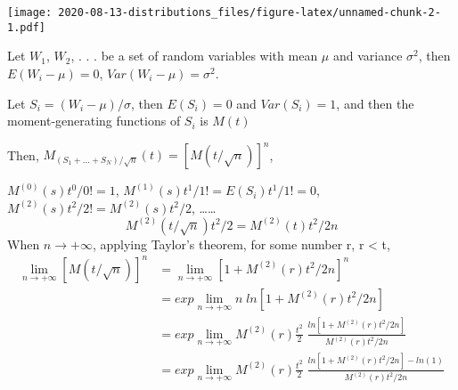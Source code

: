 \documentclass[
]{article}
\newenvironment{Shaded}{\begin{snugshade}}{\end{snugshade}}
\newcommand{\CharTok}[1]{\textcolor[rgb]{0.31,0.60,0.02}{#1}}
\newcommand{\DataTypeTok}[1]{\textcolor[rgb]{0.13,0.29,0.53}{#1}}
\newcommand{\DecValTok}[1]{\textcolor[rgb]{0.00,0.00,0.81}{#1}}
\newcommand{\FloatTok}[1]{\textcolor[rgb]{0.00,0.00,0.81}{#1}}
\newcommand{\KeywordTok}[1]{\textcolor[rgb]{0.13,0.29,0.53}{\textbf{#1}}}
\newcommand{\NormalTok}[1]{#1}
\newcommand{\OperatorTok}[1]{\textcolor[rgb]{0.81,0.36,0.00}{\textbf{#1}}}
\newcommand{\StringTok}[1]{\textcolor[rgb]{0.31,0.60,0.02}{#1}}
\begin{document}
\begin{Shaded}
\end{Shaded}

\texttt{[image: 2020-08-13-distributions\_files/figure-latex/unnamed-chunk-2-1.pdf]}

Let \(W_1\), \(W_2\), . . . be a set of random variables with mean
\(\mu\) and variance \(\sigma^2\), then \(E(W_i-\mu)=0\),
\(Var(W_i-\mu)=\sigma^2\).

Let \(S_i=(W_i-\mu)/\sigma\), then \(E(S_i)=0\) and \(Var(S_i)=1\), and
then the moment-generating functions of \(S_i\) is \(M(t)\)

Then, \(M_{(S_1+...+S_N)/\sqrt{n}}(t)=[M(t/\sqrt{n})]^n\),

\(M^{(0)}(s)t^0/0!=1\), \(M^{(1)}(s)t^1/1!=E(S_i)t^1/1!=0\),
\(M^{(2)}(s)t^2/2!=M^{(2)}(s)t^2/2\), \ldots\ldots{}
\[M^{(2)}(t/\sqrt{n})t^2/2=M^{(2)}(t)t^2/2n\] When \(n\to+\infty\),
applying Taylor's theorem, for some number r, \textbar r\textbar{}
\textless{} \textbar t\textbar, \[\begin{align}
\lim_{n\to+\infty}[M(t/\sqrt{n})]^n&=\lim_{n\to+\infty}[1+M^{(2)}(r)t^2/2n]^n \\
&=exp\lim_{n\to+\infty}n \;ln[1+M^{(2)}(r)t^2/2n]\\
&=exp\lim_{n\to+\infty}M^{(2)}(r)\frac{t^2}{2}\;\frac{ln[1+M^{(2)}(r)t^2/2n]}{M^{(2)}(r)t^2/2n}\\
&=exp\lim_{n\to+\infty}M^{(2)}(r)\frac{t^2}{2}\;\frac{ln[1+M^{(2)}(r)t^2/2n]-ln(1)}{M^{(2)}(r)t^2/2n}
\end{align}\]
\end{document}
